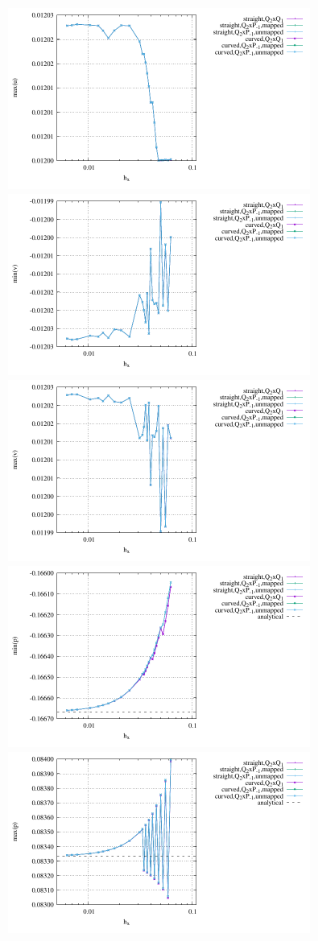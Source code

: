\begin{center}
\includegraphics[width=8cm]{python_codes/fieldstone_25/results/doneahuerta/max_u.pdf}\\
\includegraphics[width=8cm]{python_codes/fieldstone_25/results/doneahuerta/min_v.pdf}
\includegraphics[width=8cm]{python_codes/fieldstone_25/results/doneahuerta/max_v.pdf}\\
\includegraphics[width=8cm]{python_codes/fieldstone_25/results/doneahuerta/min_p.pdf}
\includegraphics[width=8cm]{python_codes/fieldstone_25/results/doneahuerta/max_p.pdf}\\
\end{center}

